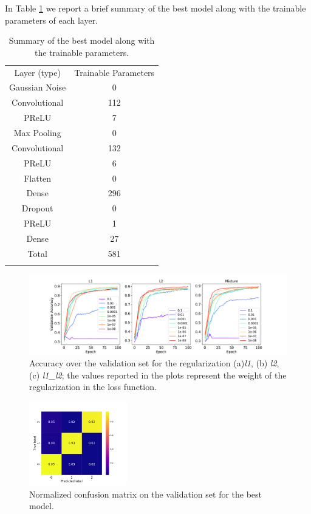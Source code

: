 \documentclass[prl, twocolumn]{revtex4-1}
\begin{document}
In Table \ref{tab:best_model} we report a brief summary of the best model along with the trainable parameters of each layer.

\begin{table}[!tb]
\begin{tabular}{c c}
    \toprule
    Layer (type) & Trainable Parameters\\\colrule
    Gaussian Noise & 0\\
    Convolutional & 112\\
    PReLU & 7\\
    Max Pooling & 0\\
    Convolutional & 132\\
    PReLU & 6\\
    Flatten & 0\\
    Dense & 296\\
    Dropout & 0\\
    PReLU & 1\\
    Dense & 27\\
    \colrule
    Total & 581 \\
    \botrule
\end{tabular}
\caption{Summary of the best model along with the trainable parameters.}
\label{tab:best_model}
\end{table}

\begin{figure}[!tb]
    \centering
    \includegraphics[width=1.05\textwidth]{pics/regularization.pdf}
    \caption{Accuracy over the validation set for the regularization (a)\textit{l1}, (b) \textit{l2}, (c) \textit{l1\_l2}; the values reported in the plots represent the weight of the regularization in the loss function.}
    \label{fig:val_acc_l1}
\end{figure}

\begin{figure}[!tb]
    \centering
    \includegraphics[width=0.38\textwidth]{pics/norm_conf_mat.pdf}
    \caption{Normalized confusion matrix on the validation set for the best model.}
    \label{fig:confusion_matrix}
\end{figure}
\end{document}
